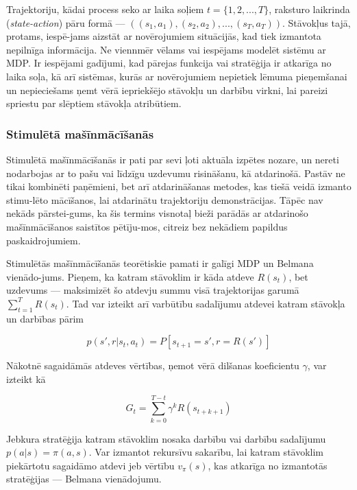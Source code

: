 \documentclass[12pt, a4paper]{article}
\numberwithin{equation}{section} %
\begin{document}
Trajektoriju, kādai process seko ar laika soļiem $t = \lbrace 1, 2, ..., T \rbrace$, raksturo laikrinda (\textit{state-action}) pāru formā --- $((s_1, a_1), (s_2, a_2), ..., (s_T, a_T))$. Stāvokļus tajā, protams, iespē-jams aizstāt ar novērojumiem situācijās, kad tiek izmantota nepilnīga informācija. Ne viennmēr vēlams vai iespējams modelēt sistēmu ar MDP. Ir iespējami gadījumi, kad pārejas funkcija vai stratēģija ir atkarīga no laika soļa, kā arī sistēmas, kurās ar novērojumiem nepietiek lēmuma pieņemšanai un nepieciešams ņemt vērā iepriekšējo stāvokļu un darbību virkni, lai pareizi spriestu par slēptiem stāvokļa atribūtiem. 

\subsubsection{Stimulētā mašīnmācīšanās}

Stimulētā mašīnmācīšanās ir pati par sevi ļoti aktuāla izpētes nozare, un nereti nodarbojas ar to pašu vai līdzīgu uzdevumu risināšanu, kā atdarinošā. Pastāv ne tikai kombinēti paņēmieni\cite{gupta2019relay, brown2019extrapolating}, bet arī atdarināšanas metodes, kas tiešā veidā izmanto stimu-lēto mācīšanos, lai atdarinātu trajektoriju demonstrācijas\cite{englert2018learning}. Tāpēc nav nekāds pārstei-gums, ka šis termins visnotaļ bieži parādās ar atdarinošo mašīnmācīšanos saistītos pētīju-mos, citreiz bez nekādiem papildus paskaidrojumiem.

Stimulētās mašīnmācīšanās teorētiskie pamati ir galīgi MDP un Belmana vienādo-jums\cite{sutton2018reinforcement}. Pieņem, ka katram stāvoklim ir kāda atdeve $R(s_t)$, bet uzdevums --- maksimizēt šo atdevju summu visā trajektorijas garumā $\sum_{t=1}^T R(s_t)$. Tad var izteikt arī varbūtību sadalījumu atdevei katram stāvokļa un darbības pārim

\begin{equation}
    p(s', r \vert s_t, a_t) = P[s_{t+1}=s', r=R(s')]
\end{equation}

Nākotnē sagaidāmās atdeves vērtības, ņemot vērā dilšanas koeficientu $\gamma$,  var izteikt kā

\begin{equation}
    G_t = \sum_{k=0}^{T-t} \gamma^k R(s_{t+k+1})
\end{equation}

Jebkura stratēģija katram stāvoklim nosaka darbību vai darbību sadalījumu $p(a \vert s) = \pi(a,s)$. Var izmantot rekursīvu sakarību, lai katram stāvoklim piekārtotu sagaidāmo atdevi jeb vērtību $v_{\pi}(s)$, kas atkarīga no izmantotās stratēģijas --- Belmana vienādojumu.
\end{document}
